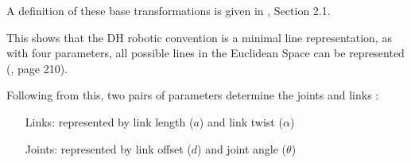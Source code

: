A definition of these base transformations is given in  \cite{allgInvKin}, Section 2.1.

This shows that the \ac{DH} robotic convention is a minimal line representation, as with four parameters, all possible lines in the Euclidean Space can be represented (\cite{AutRobVeh}, page 210).

Following from this, two pairs of parameters determine the joints and links \cite{ConstantinForwardKA}:
\begin{itemize}[wide=\parindent] 
	\item[Links:] represented by link length ($a$) and link twist ($\alpha$)
	\item[Joints:] represented by link offset ($d$)
	and joint angle ($\theta$) 
\end{itemize}
\phantom{}\\
